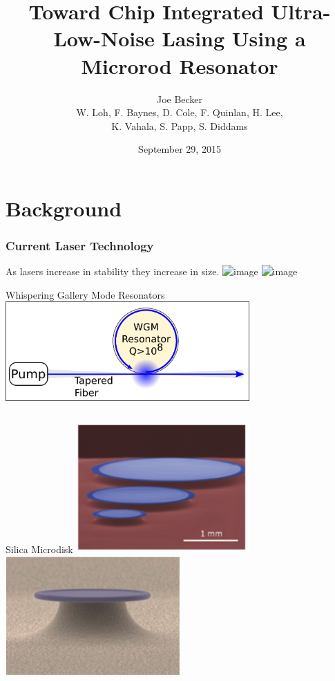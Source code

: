 \documentclass{beamer}
\title[Microrod Lasing]{Toward Chip Integrated Ultra-Low-Noise Lasing Using a Microrod Resonator} %
\author[J. Becker]{Joe Becker \\
\scriptsize{W. Loh, F. Baynes, D. Cole, F. Quinlan, H. Lee,\\
K. Vahala, S. Papp, S. Diddams}} %
\institute[NIST] %
{
National Institute of Standards and Technology\\ %
\medskip
\textit{Joe.Becker@nist.gov} %
}
\date{September 29, 2015} %
\begin{document}
\begin{frame}
\titlepage %
\end{frame}


\section{Background} 
\begin{frame}\frametitle{Current Laser Technology}
As lasers increase in stability they increase in size.
\includegraphics<1>[width=0.95\textwidth]{Images/Current_Laser1.png}
\includegraphics<2>[width=0.95\textwidth]{Images/Current_Laser2.png}
\end{frame}

\begin{frame}{Whispering Gallery Mode Resonators}
\centering
\includegraphics[width=0.7\textwidth]{Images/WGM_Resonator_Fig.png}
\begin{columns}

\begin{block}{Silica Microdisk}
\includegraphics[width=0.5\textwidth]{Images/Wedge_Microdisk.png}
\includegraphics[width=0.5\textwidth]{Images/Microtoroid.png}


\end{block}
\end{columns}
\end{frame}
\end{document}
